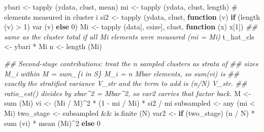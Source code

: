 \documentclass[
  letterpaper,
  DIV=11,
  numbers=noendperiod]{scrreprt}
\newenvironment{Shaded}{\begin{snugshade}}{\end{snugshade}}
\newcommand{\CommentTok}[1]{\textcolor[rgb]{0.37,0.37,0.37}{#1}}
\newcommand{\ControlFlowTok}[1]{\textcolor[rgb]{0.00,0.23,0.31}{\textbf{#1}}}
\newcommand{\DecValTok}[1]{\textcolor[rgb]{0.68,0.00,0.00}{#1}}
\newcommand{\DocumentationTok}[1]{\textcolor[rgb]{0.37,0.37,0.37}{\textit{#1}}}
\newcommand{\FunctionTok}[1]{\textcolor[rgb]{0.28,0.35,0.67}{#1}}
\newcommand{\NormalTok}[1]{\textcolor[rgb]{0.00,0.23,0.31}{#1}}
\newcommand{\OtherTok}[1]{\textcolor[rgb]{0.00,0.23,0.31}{#1}}
\newcommand{\SpecialCharTok}[1]{\textcolor[rgb]{0.37,0.37,0.37}{#1}}
\renewcommand{\[}{\begin{equation}}
\renewcommand{\]}{\end{equation}}
\begin{document}
\begin{Shaded}
\begin{Highlighting}[]
\NormalTok{  ybari }\OtherTok{\textless{}{-}} \FunctionTok{tapply}\NormalTok{ (ydata, clust, mean)}
\NormalTok{  mi    }\OtherTok{\textless{}{-}} \FunctionTok{tapply}\NormalTok{ (ydata, clust, length)           }\CommentTok{\# elements measured in cluster i}
\NormalTok{  si2   }\OtherTok{\textless{}{-}} \FunctionTok{tapply}\NormalTok{ (ydata, clust, }\ControlFlowTok{function}\NormalTok{ (v) }\ControlFlowTok{if}\NormalTok{ (}\FunctionTok{length}\NormalTok{ (v) }\SpecialCharTok{\textgreater{}} \DecValTok{1}\NormalTok{) }\FunctionTok{var}\NormalTok{ (v) }\ControlFlowTok{else} \DecValTok{0}\NormalTok{)}
\NormalTok{  Mi    }\OtherTok{\textless{}{-}} \FunctionTok{tapply}\NormalTok{ (data[, csize], clust, }\ControlFlowTok{function}\NormalTok{ (x) x[}\DecValTok{1}\NormalTok{])}
  \DocumentationTok{\#\# same as the cluster total if all Mi elements were measured (mi = Mi)}
\NormalTok{  t\_hat\_cls }\OtherTok{\textless{}{-}}\NormalTok{ ybari }\SpecialCharTok{*}\NormalTok{ Mi}
\NormalTok{  n }\OtherTok{\textless{}{-}} \FunctionTok{length}\NormalTok{ (Mi)}

  \DocumentationTok{\#\# Second{-}stage contributions: treat the n sampled clusters as strata of}
  \DocumentationTok{\#\# sizes M\_i within M = sum\_\{i in S\} M\_i = n Mbar elements, so sum(vi) is}
  \DocumentationTok{\#\# exactly the stratified variance V\_str and the term to add is (n/N) V\_str.}
  \DocumentationTok{\#\# ratio\_est() divides by xbar\^{}2 = Mbar\^{}2, so var2 carries that factor back.}
\NormalTok{  M          }\OtherTok{\textless{}{-}} \FunctionTok{sum}\NormalTok{ (Mi)}
\NormalTok{  vi         }\OtherTok{\textless{}{-}}\NormalTok{ (Mi }\SpecialCharTok{/}\NormalTok{ M)}\SpecialCharTok{\^{}}\DecValTok{2} \SpecialCharTok{*}\NormalTok{ (}\DecValTok{1} \SpecialCharTok{{-}}\NormalTok{ mi }\SpecialCharTok{/}\NormalTok{ Mi) }\SpecialCharTok{*}\NormalTok{ si2 }\SpecialCharTok{/}\NormalTok{ mi}
\NormalTok{  subsampled }\OtherTok{\textless{}{-}} \FunctionTok{any}\NormalTok{ (mi }\SpecialCharTok{\textless{}}\NormalTok{ Mi)}
\NormalTok{  two\_stage  }\OtherTok{\textless{}{-}}\NormalTok{ subsampled }\SpecialCharTok{\&\&} \FunctionTok{is.finite}\NormalTok{ (N)}
\NormalTok{  var2       }\OtherTok{\textless{}{-}} \ControlFlowTok{if}\NormalTok{ (two\_stage) (n }\SpecialCharTok{/}\NormalTok{ N) }\SpecialCharTok{*} \FunctionTok{sum}\NormalTok{ (vi) }\SpecialCharTok{*} \FunctionTok{mean}\NormalTok{ (Mi)}\SpecialCharTok{\^{}}\DecValTok{2} \ControlFlowTok{else} \DecValTok{0}


\end{Highlighting}
\end{Shaded}
\end{document}
